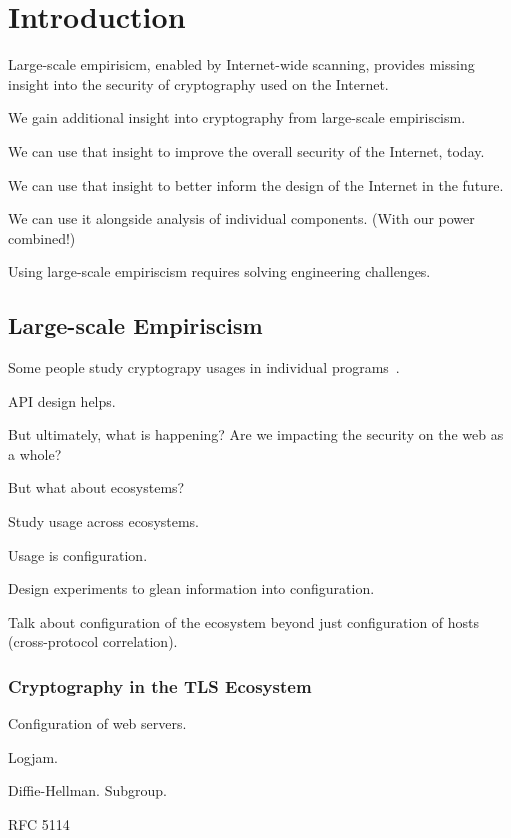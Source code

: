 



\chapter{Introduction}

Large-scale empirisicm, enabled by Internet-wide scanning, provides missing insight into the security of cryptography used on the Internet.

We gain additional insight into cryptography from large-scale empiriscism.

We can use that insight to improve the overall security of the Internet, today.

We can use that insight to better inform the design of the Internet in the future.

We can use it alongside analysis of individual components. (With our power combined!)

Using large-scale empiriscism requires solving engineering challenges.

\section{Large-scale Empiriscism}

Some people study cryptograpy usages in individual programs~\cite{most-dangerous-code-2012}.

API design helps.

But ultimately, what is happening? Are we impacting the security on the web as a whole?

But what about ecosystems?

Study usage across ecosystems.

Usage is configuration.

Design experiments to glean information into configuration.

Talk about configuration of the ecosystem beyond just configuration of hosts (cross-protocol correlation).

\subsection{Cryptography in the TLS Ecosystem}

Configuration of web servers.

Logjam.

Diffie-Hellman. Subgroup.

RFC 5114

